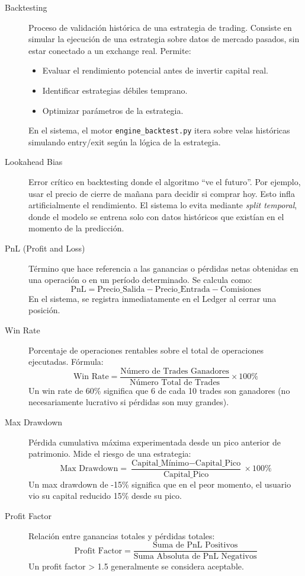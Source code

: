 \begin{description}
    \item[Backtesting] Proceso de validación histórica de una estrategia de trading. Consiste en simular la ejecución de una estrategia sobre datos de mercado pasados, sin estar conectado a un exchange real. Permite:
    \begin{itemize}
        \item Evaluar el rendimiento potencial antes de invertir capital real.
        \item Identificar estrategias débiles temprano.
        \item Optimizar parámetros de la estrategia.
    \end{itemize}
    En el sistema, el motor \texttt{engine\_backtest.py} itera sobre velas históricas simulando entry/exit según la lógica de la estrategia.

    \item[Lookahead Bias] Error crítico en backtesting donde el algoritmo ``ve el futuro''. Por ejemplo, usar el precio de cierre de mañana para decidir si comprar hoy. Esto infla artificialmente el rendimiento. El sistema lo evita mediante \textit{split temporal}, donde el modelo se entrena solo con datos históricos que existían en el momento de la predicción.

    \item[PnL (Profit and Loss)] Término que hace referencia a las ganancias o pérdidas netas obtenidas en una operación o en un período determinado. Se calcula como:
    $$\text{PnL} = \text{Precio\_Salida} - \text{Precio\_Entrada} - \text{Comisiones}$$
    En el sistema, se registra inmediatamente en el Ledger al cerrar una posición.

    \item[Win Rate] Porcentaje de operaciones rentables sobre el total de operaciones ejecutadas. Fórmula:
    $$\text{Win Rate} = \frac{\text{Número de Trades Ganadores}}{\text{Número Total de Trades}} \times 100\%$$
    Un win rate de 60\% significa que 6 de cada 10 trades son ganadores (no necesariamente lucrativo si pérdidas son muy grandes).

    \item[Max Drawdown] Pérdida cumulativa máxima experimentada desde un pico anterior de patrimonio. Mide el riesgo de una estrategia:
    $$\text{Max Drawdown} = \frac{\text{Capital\_Mínimo} - \text{Capital\_Pico}}{\text{Capital\_Pico}} \times 100\%$$
    Un max drawdown de -15\% significa que en el peor momento, el usuario vio su capital reducido 15\% desde su pico.

    \item[Profit Factor] Relación entre ganancias totales y pérdidas totales:
    $$\text{Profit Factor} = \frac{\text{Suma de PnL Positivos}}{\text{Suma Absoluta de PnL Negativos}}$$
    Un profit factor > 1.5 generalmente se considera aceptable.

\end{description}

